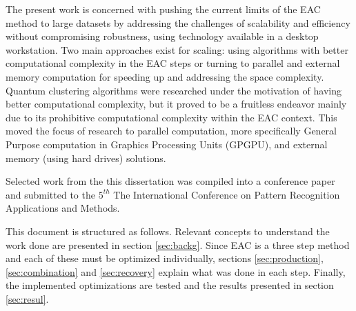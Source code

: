 The present work is concerned with pushing the current limits of the EAC method to large datasets by addressing the challenges of scalability and efficiency without compromising robustness, using technology available in a desktop workstation.
Two main approaches exist for scaling: using algorithms with better computational complexity in the EAC steps or turning to parallel and external memory computation for speeding up and addressing the space complexity.
Quantum clustering algorithms \cite{Casper2012KMeans,Horn2001a} were researched under the motivation of having better computational complexity, but it proved to be a fruitless endeavor mainly due to its prohibitive computational complexity within the EAC context.
This moved the focus of research to parallel computation, more specifically General Purpose computation in Graphics Processing Units (GPGPU), and external memory (using hard drives) solutions.

Selected work from the this dissertation was compiled into a conference paper and submitted to the $5^{th}$ The International Conference on Pattern Recognition Applications and Methods.

This document is structured as follows.
Relevant concepts to understand the work done are presented in section \ref{sec:backg}.
Since EAC is a three step method and each of these must be optimized individually, sections \ref{sec:production}, \ref{sec:combination} and \ref{sec:recovery} explain what was done in each step.
Finally, the implemented optimizations are tested and the results presented in section \ref{sec:resul}.

